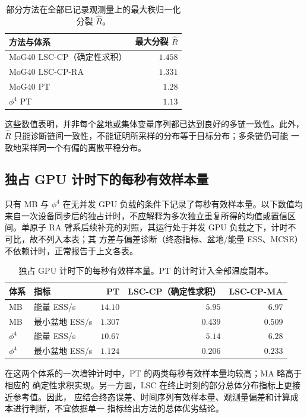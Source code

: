 \documentclass[11pt,a4paper]{article}
\begin{document}
\begin{table}[H]
\centering
\small
\begin{tabular}{lr}
\toprule
方法与体系 & 最大分裂 $\widehat R$ \\
\midrule
MoG40 LSC-CP（确定性求积） & $1.458$ \\
MoG40 LSC-CP-RA & $1.331$ \\
MoG40 PT & $1.28$ \\
$\phi^4$ PT & $1.13$ \\
\bottomrule
\end{tabular}
\caption{部分方法在全部已记录观测量上的最大秩归一化分裂 $\widehat R$。}
\end{table}

这些数值表明，并非每个盆地或集体变量序列都已达到良好的多链一致性。此外，
$\widehat R$ 只能诊断链间一致性，不能证明所采样的分布等于目标分布；多条链仍可能
一致地采样同一个有偏的离散平稳分布。

\subsection{独占 GPU 计时下的每秒有效样本量}

只有 MB 与 $\phi^4$ 在无并发 GPU 负载的条件下记录了每秒有效样本量。以下数值均
来自一次设备同步后的独占计时，不应解释为多次独立重复所得的均值或置信区间。单原子
RA 臂系后续补充的对照，其运行处于并发 GPU 负载之下，计时不可比，故不列入本表；其
方差与偏差诊断（终态指标、盆地/能量 ESS、MCSE）不依赖计时，正常报告于上文各表。

\begin{table}[H]
\centering
\small
\begin{tabular}{llrrr}
\toprule
体系 & 指标 & PT & LSC-CP（确定性求积） & LSC-CP-MA \\
\midrule
MB & 能量 ESS/s & $14.10$ & $5.95$ & $6.97$ \\
MB & 最小盆地 ESS/s & $1.307$ & $0.439$ & $0.509$ \\
$\phi^4$ & 能量 ESS/s & $10.67$ & $5.14$ & $6.28$ \\
$\phi^4$ & 最小盆地 ESS/s & $1.124$ & $0.206$ & $0.233$ \\
\bottomrule
\end{tabular}
\caption{独占 GPU 计时下的每秒有效样本量。PT 的计时计入全部温度副本。}
\end{table}

在这两个体系的一次墙钟计时中，PT 的两类每秒有效样本量均较高；MA 略高于相应的
确定性求积实现。另一方面，LSC 在终止时刻的部分总体分布指标上更接近参考值。因此，
应结合终态误差、时间序列有效样本量、观测量偏差和计算成本进行判断，不宜依据单一
指标给出方法的总体优劣结论。
\end{document}
